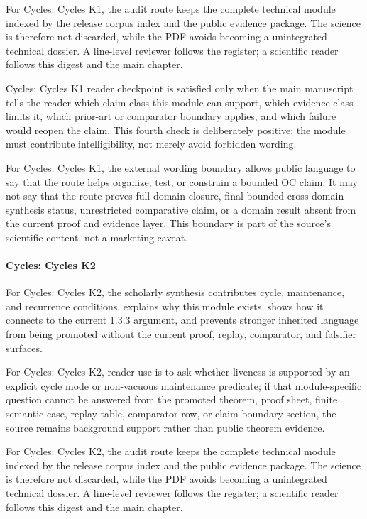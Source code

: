 For Cycles: Cycles K1, the audit route keeps the complete technical module indexed by the release corpus index and the public evidence package. The science is therefore not discarded, while the PDF avoids becoming a unintegrated technical dossier. A line-level reviewer follows the register; a scientific reader follows this digest and the main chapter.


Cycles: Cycles K1 reader checkpoint is satisfied only when the main manuscript tells the reader which claim class this module can support, which evidence class limits it, which prior-art or comparator boundary applies, and which failure would reopen the claim. This fourth check is deliberately positive: the module must contribute intelligibility, not merely avoid forbidden wording.


For Cycles: Cycles K1, the external wording boundary allows public language to say that the route helps organize, test, or constrain a bounded OC claim. It may not say that the route proves full-domain closure, final bounded cross-domain synthesis status, unrestricted comparative claim, or a domain result absent from the current proof and evidence layer. This boundary is part of the source's scientific content, not a marketing caveat.


\paragraph{Cycles: Cycles K2}

For Cycles: Cycles K2, the scholarly synthesis contributes cycle, maintenance, and recurrence conditions, explains why this module exists, shows how it connects to the current 1.3.3 argument, and prevents stronger inherited language from being promoted without the current proof, replay, comparator, and falsifier surfaces.


For Cycles: Cycles K2, reader use is to ask whether liveness is supported by an explicit cycle mode or non-vacuous maintenance predicate; if that module-specific question cannot be answered from the promoted theorem, proof sheet, finite semantic case, replay table, comparator row, or claim-boundary section, the source remains background support rather than public theorem evidence.


For Cycles: Cycles K2, the audit route keeps the complete technical module indexed by the release corpus index and the public evidence package. The science is therefore not discarded, while the PDF avoids becoming a unintegrated technical dossier. A line-level reviewer follows the register; a scientific reader follows this digest and the main chapter.


